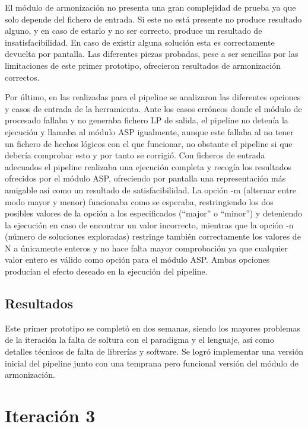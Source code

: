 El módulo de armonización no presenta una gran complejidad de prueba ya que solo depende del fichero de entrada. Si este no está presente no produce resultado alguno, y en caso de estarlo y no ser correcto, produce un resultado de insatisfacibilidad. En caso de existir alguna solución esta es correctamente devuelta por pantalla. Las diferentes piezas probadas, pese a ser sencillas por las limitaciones de este primer prototipo, ofrecieron resultados de armonización correctos.

Por último, en las realizadas para el pipeline se analizaron las diferentes opciones y casos de entrada de la herramienta. Ante los casos erróneos donde el módulo de procesado fallaba y no generaba fichero LP de salida, el pipeline no detenía la ejecución y llamaba al módulo ASP igualmente, aunque este fallaba al no tener un fichero de hechos lógicos con el que funcionar, no obstante el pipeline si que debería comprobar esto y por tanto se corrigió. Con ficheros de entrada adecuados el pipeline realizaba una ejecución completa y recogía los resultados ofrecidos por el módulo ASP, ofreciendo por pantalla una representación más amigable así como un resultado de satisfacibilidad. La opción -m (alternar entre modo mayor y menor) funcionaba como se esperaba, restringiendo los dos posibles valores de la opción a los especificados (``major'' o ``minor'') y deteniendo la ejecución en caso de encontrar un valor incorrecto, mientras que la opción -n (número de soluciones exploradas) restringe también correctamente los valores de N a únicamente enteros y no hace falta mayor comprobación ya que cualquier valor entero es válido como opción para el módulo ASP. Ambas opciones producían el efecto deseado en la ejecución del pipeline.

\subsection{Resultados}
\label{subsec:second_iteration_results}
Este primer prototipo se completó en dos semanas, siendo los mayores problemas de la iteración la falta de soltura con el paradigma y el lenguaje, así como detalles técnicos de falta de librerías y software. Se logró implementar una versión inicial del pipeline junto con una temprana pero funcional versión del módulo de armonización.


\section{Iteración 3}
\label{sec:third_iteration}
